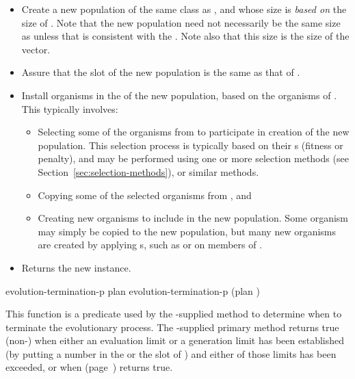 {{\begin{itemize}
			\item Create a new population of the same class as
			, and whose size is {\em based on} the size
			of .  
			Note that the new population need not necessarily be the same
			size as  unless that is consistent with the
			. Note also that this size is the size of the
			 vector.
			
			\item Assure that the  slot of the new population is the
			same as that of .
			
			\item Install organisms in the  of the new population, 
			based on the organisms of .  This typically involves:
			\begin{itemize}
				\item Selecting some of the organisms from
				 to participate in creation of the new
				population.  This selection process is typically based on
				their s (fitness or penalty), and may be performed using
				one or more selection methods (see Section~\ref{sec:selection-methods}), 
				or similar methods.
				\item Copying some of the selected organisms from , and
				\item Creating new organisms to include in the new population.
				Some organism may simply be copied to the new population, but many new
				organisms are created by applying s, such as
				 or  on members of .
			\end{itemize}
			\item Returns the new  instance.
		\end{itemize}
	}%
	
	\filbreak
	{\samepage
		\Defgeneric evolution-termination-p {plan}  \label{evolution-termination-p}
		 evolution-termination-p {(plan )}
		
		This function is a predicate used by the \geco-supplied method  to
		determine when to terminate the evolutionary process. The
		\geco-supplied primary method returns true (non-) when either an evaluation
		limit or a generation limit has been established (by putting a number in the
		 or the  slot of ) and
		either of those limits has been exceeded, or when 
		(page~\pageref{population:converged-p}) returns true.
		\par}%
	\filbreak
	
}
